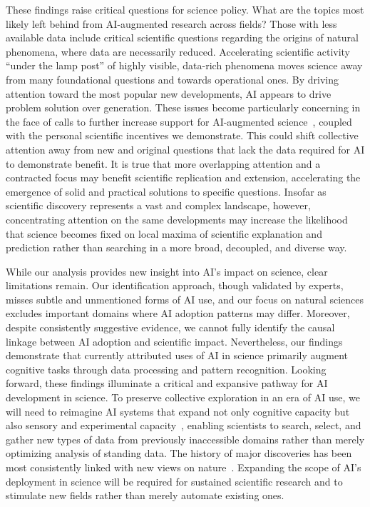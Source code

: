 These findings raise critical questions for science policy. What are the topics most likely left behind from AI-augmented research across fields? Those with less available data include critical scientific questions regarding the origins of natural phenomena, where data are necessarily reduced. Accelerating scientific activity “under the lamp post” of highly visible, data-rich phenomena moves science away from many foundational questions and towards operational ones. By driving attention toward the most popular new developments, AI appears to drive problem solution over generation. These issues become particularly concerning in the face of calls to further increase support for AI-augmented science~\supercite{borger2023artificial,lawrence2024accelerating}, coupled with the personal scientific incentives we demonstrate. This could shift collective attention away from new and original questions that lack the data required for AI to demonstrate benefit.
It is true that more overlapping attention and a contracted focus may benefit scientific replication and extension, accelerating the emergence of solid and practical solutions to specific questions.
Insofar as scientific discovery represents a vast and complex landscape, however, concentrating attention on the same developments may increase the likelihood that science becomes fixed on local maxima of scientific explanation and prediction rather than searching in a more broad, decoupled, and diverse way.

While our analysis provides new insight into AI's impact on science, clear limitations remain. Our identification approach, though validated by experts, misses subtle and unmentioned forms of AI use, and our focus on natural sciences excludes important domains where AI adoption patterns may differ. Moreover, despite consistently suggestive evidence, we cannot fully identify the causal linkage between AI adoption and scientific impact. Nevertheless, our findings demonstrate that currently attributed uses of AI in science primarily augment cognitive tasks through data processing and pattern recognition. Looking forward, these findings illuminate a critical and expansive pathway for AI development in science. To preserve collective exploration in an era of AI use, we will need to reimagine AI systems that expand not only cognitive capacity but also sensory and experimental capacity~\supercite{king2009automation,burger2020mobile}, enabling scientists to search, select, and gather new types of data from previously inaccessible domains rather than merely optimizing analysis of standing data. The history of major discoveries has been most consistently linked with new views on nature~\supercite{krauss2024debunking}.
Expanding the scope of AI's deployment in science will be required for sustained scientific research and to stimulate new fields rather than merely automate existing ones.